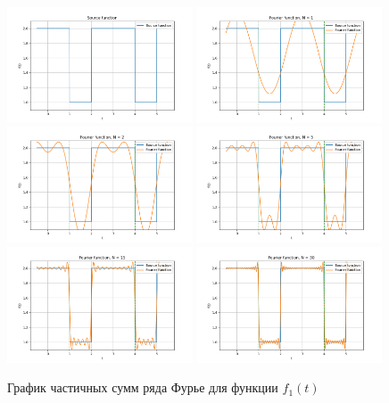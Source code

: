 \begin{figure}[ht!]
    \centering
    \includegraphics[width=0.49\textwidth]{media/plots/func_1.png}
    \includegraphics[width=0.49\textwidth]{media/plots/func_1_N_1.png}
    \includegraphics[width=0.49\textwidth]{media/plots/func_1_N_2.png}
    \includegraphics[width=0.49\textwidth]{media/plots/func_1_N_5.png}
    \includegraphics[width=0.49\textwidth]{media/plots/func_1_N_15.png}
    \includegraphics[width=0.49\textwidth]{media/plots/func_1_N_30.png}
    \caption{График частичных сумм ряда Фурье для функции $f_1(t)$}
    \label{fig:func_1_plot}
\end{figure}

